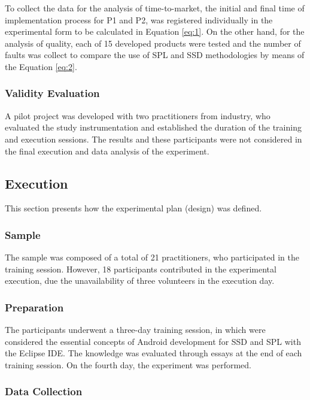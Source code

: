 To collect the data for the analysis of time-to-market, the initial and final time of implementation process for P1 and P2, was registered individually in the experimental form to be calculated in Equation \ref{eq:1}. On the other hand, for the analysis of quality, each of 15 developed products were tested and the number of faults was collect to compare the use of SPL and SSD methodologies by means of the Equation \ref{eq:2}.

\subsubsection{Validity Evaluation}

A pilot project was developed with two practitioners from industry, who evaluated the study instrumentation and established the duration of the training and execution sessions. The results and these participants were not considered in the final execution and data analysis of the experiment.

\subsection{Execution}\label{sub:execution}

This section presents how the experimental plan (design) was defined.

\subsubsection{Sample}

The sample was composed of a total of 21 practitioners, who participated in the training session. However, 18 participants contributed in the experimental execution, due the unavailability of three volunteers in the execution day.

\subsubsection{Preparation}

The participants underwent a three-day training session, in which were considered the essential concepts of Android development for SSD and SPL with the Eclipse IDE. The knowledge was evaluated through essays at the end of each training session. On the fourth day, the experiment was performed.

\subsubsection{Data Collection}

